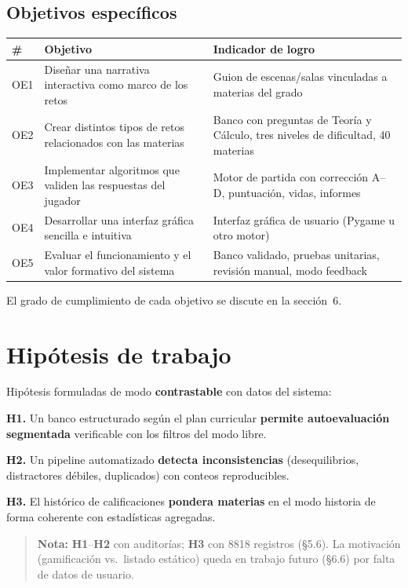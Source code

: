 \documentclass[11pt,a4paper]{article}
\newcommand{\bloquetfg}[1]{\par\smallskip\noindent #1\par}
\begin{document}
\subsection{Objetivos específicos}

{\small\setlength{\tabcolsep}{4pt}%
\begin{tabular}{@{}l>{\raggedright\arraybackslash}p{3.4cm}>{\raggedright\arraybackslash}p{7.8cm}@{}}
\toprule
\textbf{\#} & \textbf{Objetivo} & \textbf{Indicador de logro} \\
\midrule
OE1 & Diseñar una narrativa interactiva como marco de los retos & Guion de escenas/salas vinculadas a materias del grado \\
OE2 & Crear distintos tipos de retos relacionados con las materias & Banco con preguntas de Teoría y Cálculo, tres niveles de dificultad, 40 materias \\
OE3 & Implementar algoritmos que validen las respuestas del jugador & Motor de partida con corrección A--D, puntuación, vidas, informes \\
OE4 & Desarrollar una interfaz gráfica sencilla e intuitiva & Interfaz gráfica de usuario (Pygame u otro motor) \\
OE5 & Evaluar el funcionamiento y el valor formativo del sistema & Banco validado, pruebas unitarias, revisión manual, modo feedback \\
\bottomrule
\end{tabular}}

\bloquetfg{El grado de cumplimiento de cada objetivo se discute en la sección~6.}

\section{Hipótesis de trabajo}

Hipótesis formuladas de modo \textbf{contrastable} con datos del sistema:

\textbf{H1.} Un banco estructurado según el plan curricular \textbf{permite autoevaluación segmentada} verificable con los filtros del modo libre.

\textbf{H2.} Un pipeline automatizado \textbf{detecta inconsistencias} (desequilibrios, distractores débiles, duplicados) con conteos reproducibles.

\textbf{H3.} El histórico de calificaciones \textbf{pondera materias} en el modo historia de forma coherente con estadísticas agregadas.

\begin{quote}
\textbf{Nota:} \textbf{H1}--\textbf{H2} con auditorías; \textbf{H3} con 8818 registros (§5.6). La motivación (gamificación vs.\ listado estático) queda en trabajo futuro (§6.6) por falta de datos de usuario.
\end{quote}
\end{document}
